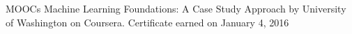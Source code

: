 \begin{cvskills}
   \cvskill
    {MOOCs}
  	{Machine Learning Foundations: A Case Study Approach by University of Washington on Coursera. Certificate earned on January 4, 2016}
\end{cvskills}